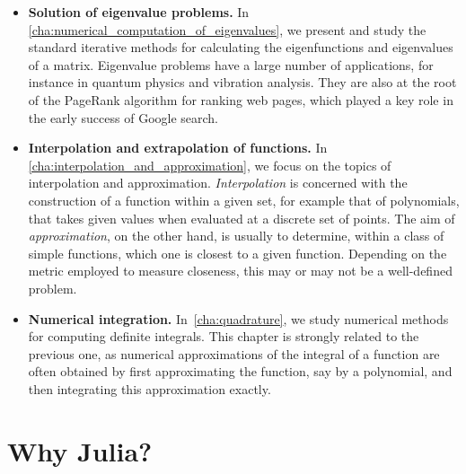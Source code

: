 \begin{itemize}
    \item
        \textbf{Solution of eigenvalue problems.}
        In \cref{cha:numerical_computation_of_eigenvalues},
        we present and study the standard iterative methods for calculating the eigenfunctions and eigenvalues of a matrix.
        Eigenvalue problems have a large number of applications,
        for instance in quantum physics and vibration analysis.
        They are also at the root of the PageRank algorithm for ranking web pages,
        which played a key role in the early success of Google search.

    \item
        \textbf{Interpolation and extrapolation of functions.}
        In \cref{cha:interpolation_and_approximation},
        we focus on the topics of interpolation and approximation.
        \emph{Interpolation} is concerned with the construction of a function within a given set,
        for example that of polynomials,
        that takes given values when evaluated at a discrete set of points.
        The aim of \emph{approximation}, on the other hand,
        is usually to determine, within a class of simple functions,
        which one is closest to a given function.
        Depending on the metric employed to measure closeness,
        this may or may not be a well-defined problem.

    \item
        \textbf{Numerical integration.}
        In~\cref{cha:quadrature},
        we study numerical methods for computing definite integrals.
        This chapter is strongly related to the previous one,
        as numerical approximations of the integral of a function are often obtained by first approximating the function,
        say by a polynomial, and then integrating this approximation exactly.
\end{itemize}


\section*{Why Julia?}%
\label{sec:why_julia_}

